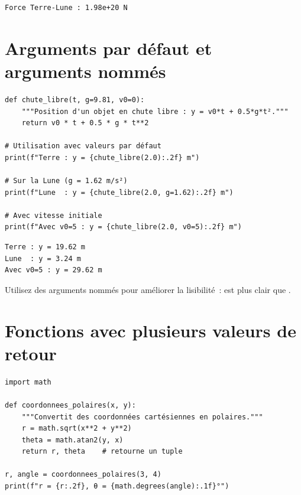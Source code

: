 \begin{codeoutput}
\begin{verbatim}
Force Terre-Lune : 1.98e+20 N
\end{verbatim}
\end{codeoutput}

\section{Arguments par d\'efaut et arguments nomm\'es}

\begin{codeblock}[title=\textbf{Python}]
\begin{verbatim}
def chute_libre(t, g=9.81, v0=0):
    """Position d'un objet en chute libre : y = v0*t + 0.5*g*t²."""
    return v0 * t + 0.5 * g * t**2

# Utilisation avec valeurs par défaut
print(f"Terre : y = {chute_libre(2.0):.2f} m")

# Sur la Lune (g = 1.62 m/s²)
print(f"Lune  : y = {chute_libre(2.0, g=1.62):.2f} m")

# Avec vitesse initiale
print(f"Avec v0=5 : y = {chute_libre(2.0, v0=5):.2f} m")
\end{verbatim}
\end{codeblock}

\begin{codeoutput}
\begin{verbatim}
Terre : y = 19.62 m
Lune  : y = 3.24 m
Avec v0=5 : y = 29.62 m
\end{verbatim}
\end{codeoutput}

\begin{bonnepratique}
Utilisez des arguments nomm\'es pour am\'eliorer la lisibilit\'e~:
 est plus clair que .
\end{bonnepratique}

\section{Fonctions avec plusieurs valeurs de retour}

\begin{codeblock}[title=\textbf{Python}]
\begin{verbatim}
import math

def coordonnees_polaires(x, y):
    """Convertit des coordonnées cartésiennes en polaires."""
    r = math.sqrt(x**2 + y**2)
    theta = math.atan2(y, x)
    return r, theta    # retourne un tuple

r, angle = coordonnees_polaires(3, 4)
print(f"r = {r:.2f}, θ = {math.degrees(angle):.1f}°")
\end{verbatim}
\end{codeblock}

